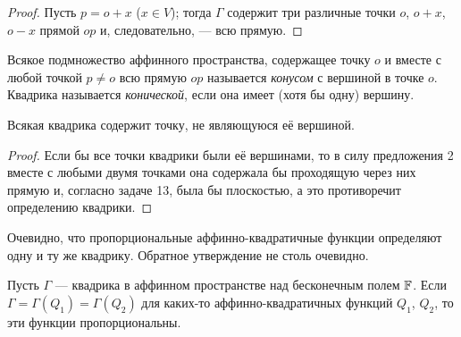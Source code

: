 \begin{proof}
    Пусть $p = o + x$ ($x \in V$); тогда $\Gamma$ содержит три различные точки $o$, $o + x$, $o - x$ прямой $op$ и, следовательно, --- всю прямую.
\end{proof}

\begin{definition}
    Всякое подмножество аффинного пространства, содержащее точку $o$ и вместе с любой точкой $p \ne o$ всю прямую $op$ называется \textit{конусом} с вершиной в точке $o$. Квадрика называется \textit{конической}, если она имеет (хотя бы одну) вершину.
\end{definition}

\begin{proposal}
    Всякая квадрика содержит точку, не являющуюся её вершиной.
\end{proposal}

\begin{proof}
    Если бы все точки квадрики были её вершинами, то в силу предложения 2 вместе с любыми двумя точками она содержала бы проходящую через них прямую и, согласно задаче 13, была бы плоскостью, а это противоречит определению квадрики.
\end{proof}

Очевидно, что пропорциональные аффинно-квадратичные функции определяют одну и ту же квадрику. Обратное утверждение не столь очевидно.

\begin{theorem}
    Пусть $\Gamma$ --- квадрика в аффинном пространстве над бесконечным полем $\mathbb{F}$. Если $\Gamma = \Gamma(Q_1) = \Gamma(Q_2)$ для каких-то аффинно-квадратичных функций $Q_1$, $Q_2$, то эти функции пропорциональны.
\end{theorem}

